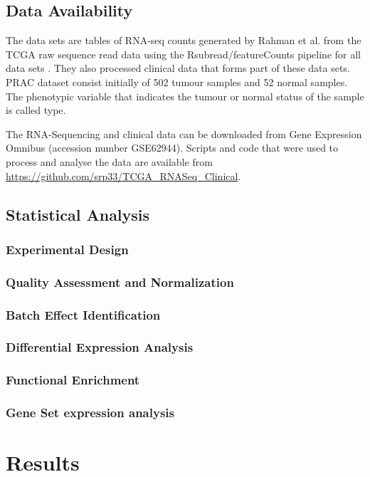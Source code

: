 \documentclass[9pt,twocolumn,twoside]{gsajnl}
\begin{document}
\subsection*{Data Availability}

The data sets are tables of RNA-seq counts generated by Rahman et al. \cite{Rahman15112015} from the TCGA raw sequence read data using the Rsubread/featureCounts pipeline for all data sets \cite{Rsubread}. They also processed clinical data that forms part of these data sets. PRAC dataset consist initially of 502 tumour samples and 52 normal samples. The phenotypic variable that indicates the tumour or normal status of the sample is called type. 

The RNA-Sequencing and clinical data can be downloaded from Gene Expression Omnibus (accession number GSE62944). Scripts and code that were used to process and analyse the data are available from \url{https://github.com/srp33/TCGA_RNASeq_Clinical}.



\subsection*{Statistical Analysis} 
\subsubsection*{Experimental Design}
\subsubsection*{Quality Assessment and Normalization}
\subsubsection*{Batch Effect Identification}
\subsubsection*{Differential Expression Analysis}
\subsubsection*{Functional Enrichment}
\subsubsection*{Gene Set expression analysis}


\section*{Results}
\end{document}
